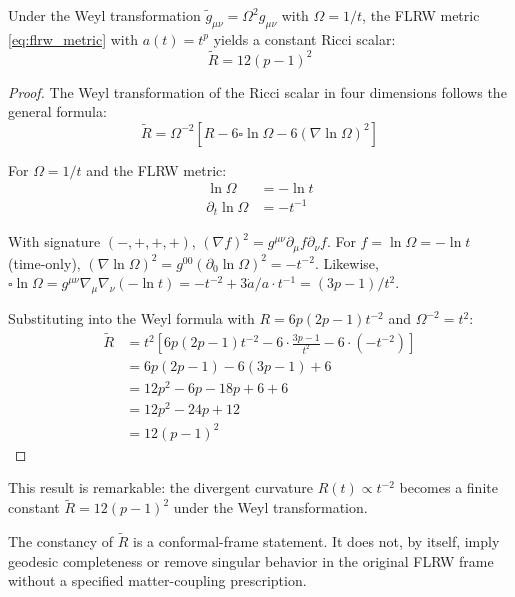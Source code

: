 \begin{theorem}
\label{thm:weyl_flrw_curvature}
Under the Weyl transformation $\tilde{g}_{\mu\nu} = \Omega^2 g_{\mu\nu}$ with $\Omega = 1/t$, the FLRW metric \eqref{eq:flrw_metric} with $a(t) = t^p$ yields a constant Ricci scalar:
\begin{equation}
\tilde{R} = 12(p-1)^2
\label{eq:weyl_ricci_constant}
\end{equation}
\end{theorem}

\begin{proof}
The Weyl transformation of the Ricci scalar in four dimensions follows the general formula:
\begin{equation}
\tilde{R} = \Omega^{-2} \left[ R - 6 \square \ln \Omega - 6 (\nabla \ln \Omega)^2 \right]
\label{eq:weyl_ricci_formula}
\end{equation}

For $\Omega = 1/t$ and the FLRW metric:
\begin{align}
\ln \Omega &= -\ln t \\
\partial_t \ln \Omega &= -t^{-1}
\end{align}

With signature $(-,+,+,+)$, $(\nabla f)^2 = g^{\mu\nu} \partial_\mu f \partial_\nu f$. For $f = \ln \Omega = -\ln t$ (time-only), $(\nabla \ln \Omega)^2 = g^{00} (\partial_0 \ln \Omega)^2 = -t^{-2}$. Likewise, $\square \ln \Omega = g^{\mu\nu} \nabla_\mu \nabla_\nu (-\ln t) = -t^{-2} + 3\dot{a}/a \cdot t^{-1} = (3p-1)/t^2$.

Substituting into the Weyl formula with $R = 6p(2p-1)t^{-2}$ and $\Omega^{-2} = t^2$:
\begin{align}
\tilde{R} &= t^2 \left[ 6p(2p-1)t^{-2} - 6 \cdot \frac{3p-1}{t^2} - 6 \cdot (-t^{-2}) \right] \\
&= 6p(2p-1) - 6(3p-1) + 6 \\
&= 12p^2 - 6p - 18p + 6 + 6 \\
&= 12p^2 - 24p + 12 \\
&= 12(p-1)^2
\end{align}
\end{proof}

This result is remarkable: the divergent curvature $R(t) \propto t^{-2}$ becomes a finite constant $\tilde{R} = 12(p-1)^2$ under the Weyl transformation.

The constancy of $\tilde{R}$ is a conformal-frame statement. It does not, by itself, imply geodesic completeness or remove singular behavior in the original FLRW frame without a specified matter-coupling prescription.

